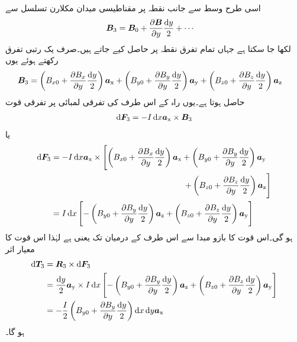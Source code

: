اسی طرح وسط سے  جانب نقطہ  پر مقناطیسی میدان مکلارن تسلسل سے
\begin{align*}
\kvec{B}_3&=\kvec{B}_0 +\frac{\partial \kvec{B}}{\partial y}\frac{\dif y}{2}+\cdots
\end{align*}
لکھا جا سکتا ہے جہاں تمام تفرق نقطہ  پر حاصل کیے جاتے ہیں۔صرف یک رتبی تفرق رکھتے ہوئے یوں
\begin{align*}
\kvec{B}_3&=\left(B_{x0}+\frac{\partial B_{x}}{\partial y} \frac{\dif y}{2}\right)\ax+\left(B_{y0}+\frac{\partial B_{y}}{\partial y} \frac{\dif y}{2}\right)\ay+\left(B_{z0}+\frac{\partial B_{z}}{\partial y} \frac{\dif y}{2}\right)\az
\end{align*}
حاصل ہوتا ہے۔یوں راہ کے اس طرف کی  تفرقی لمبائی پر تفرقی قوت
\begin{align*}
\dif \kvec{F}_3=-I \dif x \ax \times \kvec{B}_3
\end{align*}
یا
\begin{align*}
\dif \kvec{F}_3&=-I \dif x \ax \times \left[\left(B_{x0}+\frac{\partial B_{x}}{\partial y} \frac{\dif y}{2}\right)\ax+\left(B_{y0}+\frac{\partial B_{y}}{\partial y} \frac{\dif y}{2}\right)\ay \right. \\
&\quad \quad \quad \quad\quad \quad \quad \quad\quad \quad \quad \quad\quad \quad \quad \quad \left.+\left(B_{z0}+\frac{\partial B_{z}}{\partial y} \frac{\dif y}{2}\right)\az\right]\\
&=I \dif x \left[-\left(B_{y0}+\frac{\partial B_{y}}{\partial y} \frac{\dif y}{2}\right)\az+\left(B_{z0}+\frac{\partial B_{z}}{\partial y} \frac{\dif y}{2}\right)\ay \right]
\end{align*}
ہو گی۔اس قوت کا بازو مبدا سے اس طرف کے درمیان تک  یعنی  ہے لہٰذا اس قوت کا معیار اثر
\begin{align*}
\dif \kvec{T}_3&=\kvec{R}_3 \times \dif \kvec{F}_3\\
&=\frac{\dif y}{2}\ay \times I \dif x \left[-\left(B_{y0}+\frac{\partial B_{y}}{\partial y} \frac{\dif y}{2}\right)\az+\left(B_{z0}+\frac{\partial B_{z}}{\partial y} \frac{\dif y}{2}\right)\ay \right]\\
&=-\frac{I}{2}\left(B_{y0}+\frac{\partial B_{y}}{\partial y} \frac{\dif y}{2}\right)\dif x \dif y\ax
\end{align*}
ہو گا۔ 


